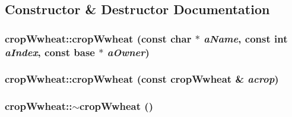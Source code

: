 \subsection{Constructor \& Destructor Documentation}
\hypertarget{classcrop_wwheat_a83736b84f650615fe4e66da97b4950bb}{
\subsubsection[{cropWwheat}]{\setlength{\rightskip}{0pt plus 5cm}cropWwheat::cropWwheat (const char $\ast$ {\em aName}, \/  const int {\em aIndex}, \/  const {\bf base} $\ast$ {\em aOwner})}}
\label{classcrop_wwheat_a83736b84f650615fe4e66da97b4950bb}
\hypertarget{classcrop_wwheat_af5d47f47e4bde1b3b698ec33a5c84c80}{
\subsubsection[{cropWwheat}]{\setlength{\rightskip}{0pt plus 5cm}cropWwheat::cropWwheat (const {\bf cropWwheat} \& {\em acrop})}}
\label{classcrop_wwheat_af5d47f47e4bde1b3b698ec33a5c84c80}
\hypertarget{classcrop_wwheat_aa04ebb606ceec1418bbeaedebea19a5e}{
\subsubsection[{$\sim$cropWwheat}]{\setlength{\rightskip}{0pt plus 5cm}cropWwheat::$\sim$cropWwheat ()}}
\label{classcrop_wwheat_aa04ebb606ceec1418bbeaedebea19a5e}



